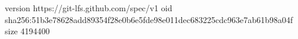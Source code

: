 version https://git-lfs.github.com/spec/v1
oid sha256:51b3e78628add89354f28e0b6e5fde98e011dec683225cdc963e7ab61b98a04f
size 4194400
